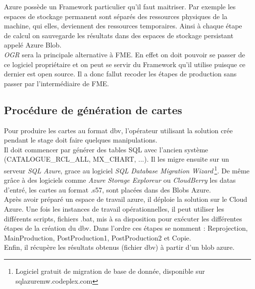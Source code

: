 Azure possède un Framework particulier qu'il faut maitriser. Par
exemple les espaces de stockage permanent sont séparés des ressources
physiques de la machine, qui elles, deviennent des ressources
temporaires. Ainsi à chaque étape de calcul on sauvegarde les
résultats dans des espaces de stockage persistant appelé Azure Blob.\\

 \textit{OGR} sera la principale alternative à FME. En effet on doit
 pouvoir se passer de ce logiciel propriétaire et on peut se servir du
 Framework qu'il utilise puisque ce dernier est open source. Il a donc
 fallut recoder les étapes de production sans passer par
 l'intermédiaire de FME.\\



%
%

\subsection{Procédure de génération de cartes}

Pour produire les cartes au format dbv, l'opérateur utilisant la
solution crée pendant le stage doit faire quelques manipulations. \\

Il doit commencer par générer des tables SQL avec l'ancien système
(CATALOGUE\_RCL\_ALL, MX\_CHART, ...). Il les migre ensuite sur un
serveur \textit{SQL Azure}, grace au logiciel \textit{SQL Database
  Migration Wizard}\,\footnote{Logiciel gratuit de migration de base
  de donnée, disponible sur sqlazuremw.codeplex.com}. De même grâce à
des logiciels comme \textit{Azure Storage Exploreur} ou
\textit{CloudBerry} les datas d'entré, les cartes au format .s57, sont
placées dans des Blobs Azure.\\

Après avoir préparé un espace de travail azure, il déploie la solution
sur le Cloud Azure. Une fois les instances de travail opérationnelles,
il peut utiliser les différents scripts, fichiers .bat, mis à sa
disposition pour exécuter les différentes étapes de la création du
dbv. Dans l'ordre ces étapes se nomment : Reprojection, MainProduction,
PostProduction1, PostProduction2 et Copie.\\

Enfin, il récupère les résultats obtenus (fichier dbv) à partir d'un
blob azure.

